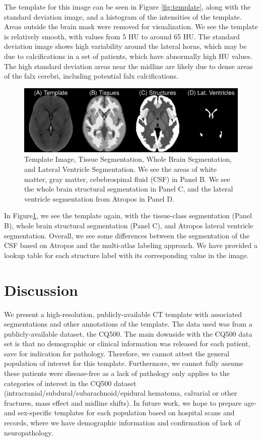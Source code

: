 \documentclass[]{elsarticle} %
\makeatletter
\def\maxwidth{\ifdim\Gin@nat@width>\linewidth\linewidth
\else\Gin@nat@width\fi}
\let\Oldincludegraphics\includegraphics
\renewcommand{\includegraphics}[1]{\Oldincludegraphics[width=\maxwidth]{#1}}
\makeatother
\begin{document}
The template for this image can be seen in Figure \ref{fig:template}, along with the standard deviation image, and a histogram of the intensities of the template. Areas outside the brain mask were removed for visualization. We see the template is relatively smooth, with values from 5 HU to around 65 HU. The standard deviation image shows high variability around the lateral horns, which may be due to calcifications in a set of patients, which have abnormally high HU values. The high standard deviation areas near the midline are likely due to dense areas of the falx cerebri, including potential falx calcifications.

\begin{figure}
\centering
\includegraphics{index_files/figure-latex/all_segs.pdf}
\caption{\label{fig:seg}Template Image, Tissue Segmentation, Whole Brain Segmentation, and Lateral Ventricle Segmentation. We see the areas of white matter, gray matter, cebebrospinal fluid (CSF) in Panel B. We see the whole brain structural segmentation in Panel C, and the lateral ventricle segmentation from Atropos in Panel D.}
\end{figure}

In Figure\ref{fig:seg}, we see the template again, with the tissue-class segmentation (Panel B), whole brain structural segmentation (Panel C), and Atropos lateral ventricle segmentation. Overall, we see some differences between the segmentation of the CSF based on Atropos and the multi-atlas labeling approach. We have provided a lookup table for each structure label with its corresponding value in the image.

\hypertarget{discussion}{%
\section{Discussion}\label{discussion}}

We present a high-resolution, publicly-available CT template with associated segmentations and other annotations of the template. The data used was from a publicly-available dataset, the CQ500. The main downside with the CQ500 data set is that no demographic or clinical information was released for each patient, save for indication for pathology. Therefore, we cannot attest the general population of interest for this template. Furthermore, we cannot fully assume these patients were disease-free as a lack of pathology only applies to the categories of interest in the CQ500 dataset (intracranial/subdural/subarachnoid/epidural hematoma, calvarial or other fractures, mass effect and midline shifts). In future work, we hope to prepare age- and sex-specific templates for each population based on hospital scans and records, where we have demographic information and confirmation of lack of neuropathology.
\end{document}
